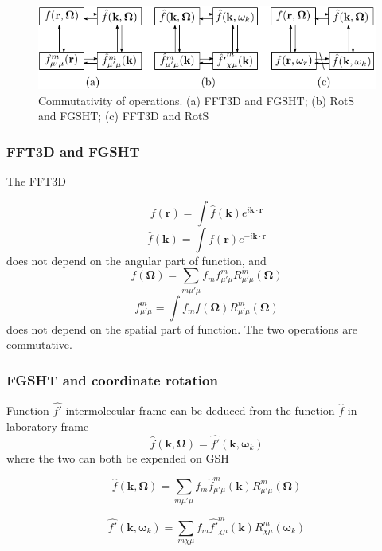 \begin{figure}[h]
\begin{centering}
\includegraphics{_figure/algorithms_commutativity}
\par\end{centering}

\caption[Commutativity of operations]{Commutativity of operations. (a) FFT3D and FGSHT; (b) RotS and FGSHT;
(c) FFT3D and RotS\label{fig:Commutativity-of-operations}}
\end{figure}



\subsubsection{FFT3D and FGSHT}

The FFT3D

\[
f(\mathbf{r})=\int\hat{f}(\mathbf{k})e^{i\mathbf{k}\cdot\mathbf{r}}
\]
\[
\hat{f}(\mathbf{k})=\int f(\mathbf{r})e^{-i\mathbf{k}\cdot\mathbf{r}}
\]
does not depend on the angular part of function, and
\[
f(\mathbf{\Omega})=\sum_{m\mu'\mu}f_{m}f_{\mu'\mu}^{m}R_{\mu'\mu}^{m}(\mathbf{\Omega})
\]
\[
f_{\mu'\mu}^{m}=\int f_{m}f(\mathbf{\Omega})R_{\mu'\mu}^{m}(\mathbf{\Omega})
\]
does not depend on the spatial part of function. The two operations
are commutative.


\subsubsection{FGSHT and coordinate rotation}

Function $\hat{f'}$ intermolecular frame can be deduced from the
function $\hat{f}$ in laboratory frame 
\[
\hat{f}(\mathbf{k},\mathbf{\Omega})=\hat{f'}(\mathbf{k},\boldsymbol{\omega}_{k})
\]
where the two can both be expended on GSH

\[
\hat{f}(\mathbf{k},\mathbf{\Omega})=\sum_{m\mu'\mu}f_{m}\hat{f}_{\mu'\mu}^{m}(\mathbf{k})R_{\mu'\mu}^{m}(\mathbf{\Omega})
\]


\[
\hat{f'}(\mathbf{k},\boldsymbol{\omega}_{k})=\sum_{m\chi\mu}f_{m}\hat{f'}_{\chi\mu}^{m}(\mathbf{k})R_{\chi\mu}^{m}(\boldsymbol{\omega}_{k})
\]


